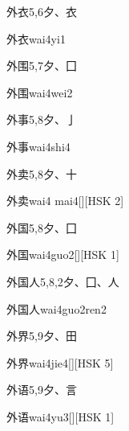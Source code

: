 \begin{entry}{外衣}{5,6}{⼣、⾐}
  \begin{phonetics}{外衣}{wai4yi1}
  \end{phonetics}
\end{entry}

\begin{entry}{外围}{5,7}{⼣、⼞}
  \begin{phonetics}{外围}{wai4wei2}
  \end{phonetics}
\end{entry}

\begin{entry}{外事}{5,8}{⼣、⼅}
  \begin{phonetics}{外事}{wai4shi4}
  \end{phonetics}
\end{entry}

\begin{entry}{外卖}{5,8}{⼣、⼗}
  \begin{phonetics}{外卖}{wai4 mai4}[][HSK 2]
  \end{phonetics}
\end{entry}

\begin{entry}{外国}{5,8}{⼣、⼞}
  \begin{phonetics}{外国}{wai4guo2}[][HSK 1]
  \end{phonetics}
\end{entry}

\begin{entry}{外国人}{5,8,2}{⼣、⼞、⼈}
  \begin{phonetics}{外国人}{wai4guo2ren2}
  \end{phonetics}
\end{entry}

\begin{entry}{外界}{5,9}{⼣、⽥}
  \begin{phonetics}{外界}{wai4jie4}[][HSK 5]
  \end{phonetics}
\end{entry}

\begin{entry}{外语}{5,9}{⼣、⾔}
  \begin{phonetics}{外语}{wai4yu3}[][HSK 1]
  \end{phonetics}
\end{entry}


